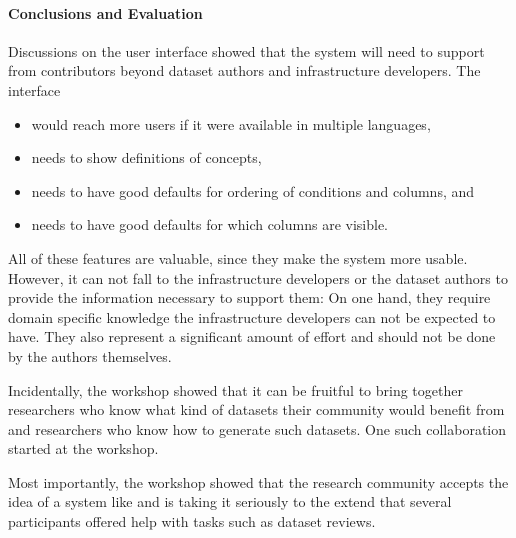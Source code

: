 \paragraph{Conclusions and Evaluation}
Discussions on the user interface showed that the system will need to support from contributors beyond dataset authors and infrastructure developers.
The interface
\begin{itemize}
\item would reach more users if it were available in multiple languages,
\item needs to show definitions of concepts,
\item needs to have good defaults for ordering of conditions and columns, and
\item needs to have good defaults for which columns are visible.
\end{itemize}
All of these features are valuable, since they make the system more usable.
However, it can not fall to the infrastructure developers or the dataset authors to provide the information necessary to support them:
On one hand, they require domain specific knowledge the infrastructure developers can not be expected to have.
They also represent a significant amount of effort and should not be done by the authors themselves.

Incidentally, the workshop showed that it can be fruitful to bring together  researchers who know what kind of datasets their community would benefit from and researchers who know how to generate such datasets.
One such collaboration started at the workshop.

Most importantly, the workshop showed that the research community accepts the idea of a system like \dmh
and is taking it seriously to the extend that several participants offered help with tasks such as dataset reviews.


